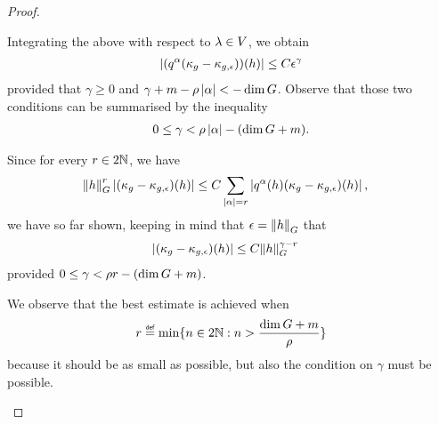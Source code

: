 \begin{proof}
\begin{description}
            Integrating the above with respect to $\lambda \in \VectorSpace$,
            we obtain
            \begin{align*}
                \abs {(q^\alpha(\kappa_g - \kappa_{g, \epsilon}))(h)}
                \leq C \epsilon^\gamma
            \end{align*}
            provided that $\gamma \geq 0$ and $\gamma + m - \rho \abs \alpha < -\dim \Group$.
            Observe that those two conditions can be summarised by the inequality
            \begin{align*}
                0 \leq \gamma < \rho \abs \alpha - (\dim \Group + m).
            \end{align*}

            Since for every $r \in 2 \N$, we have
            \begin{align*}
                \norm [\Group] h^r \abs{(\kappa_g - \kappa_{g, \epsilon})(h)}
                &\leq C \sum_{\abs \alpha = r} \abs{q^\alpha(h) (\kappa_g - \kappa_{g, \epsilon})(h)},
            \end{align*}
            we have so far shown, keeping in mind that $\epsilon = \norm [\Group] h$ that
            \begin{align}
                \abs{(\kappa_g - \kappa_{g, \epsilon})(h)}
                &\leq C \norm [\Group] h^{\gamma - r}
                \label{eq:estimate_on_the_remainder}
            \end{align}
            provided $0 \leq \gamma < \rho r - (\dim \Group + m)$.

            We observe that the best estimate is achieved when
            \begin{align*}
                r \defeq \min \{n \in 2 \N : n > \frac{\dim \Group + m} \rho \}
            \end{align*}
            because it should be as small as possible,
            but also the condition on $\gamma$ must be possible.


\end{description}
\end{proof}

